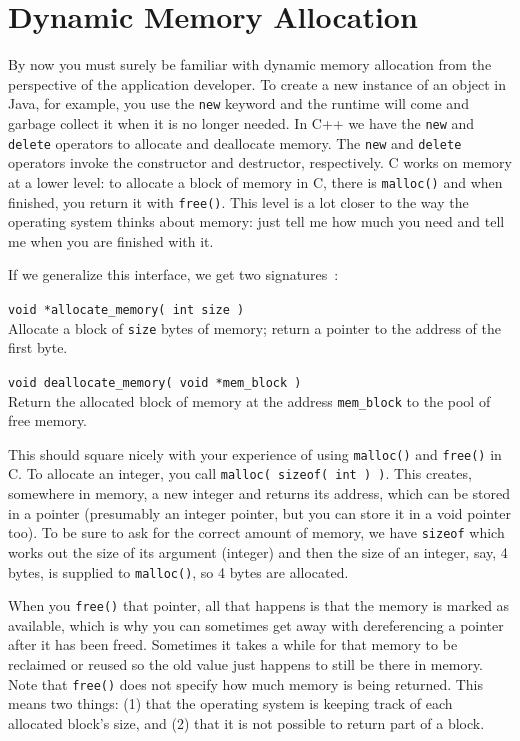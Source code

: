




\section*{Dynamic Memory Allocation}
By now you must surely be familiar with dynamic memory allocation from the perspective of the application developer. To create a new instance of an object in Java, for example, you use the \texttt{new} keyword and the runtime will come and garbage collect it when it is no longer needed. In C++ we have the \texttt{new} and \texttt{delete} operators to allocate and deallocate memory. The \texttt{new} and \texttt{delete} operators invoke the constructor and destructor, respectively. C works on memory at a lower level: to allocate a block of memory in C, there is \texttt{malloc()} and when finished, you return it with \texttt{free()}. This level is a lot closer to the way the operating system thinks about memory: just tell me how much you need and tell me when you are finished with it.

If we generalize this interface, we get two signatures~\cite{mte241}:

\texttt{void *allocate\_memory( int size )}\\
Allocate a block of \texttt{size} bytes of memory; return a pointer to the address of the first byte.

\texttt{void deallocate\_memory( void *mem\_block )}\\
Return the allocated block of memory at the address \texttt{mem\_block} to the pool of free memory.

This should square nicely with your experience of using \texttt{malloc()} and \texttt{free()} in C. To allocate an integer, you call \texttt{malloc( sizeof( int ) )}. This creates, somewhere in memory, a new integer and returns its address, which can be stored in a pointer (presumably an integer pointer, but you can store it in a void pointer too). To be sure to ask for the correct amount of memory, we have \texttt{sizeof} which works out the size of its argument (integer) and then the size of an integer, say, 4 bytes, is supplied to \texttt{malloc()}, so 4 bytes are allocated. 

When you \texttt{free()} that pointer, all that happens is that the memory is marked as available, which is why you can sometimes get away with dereferencing a pointer after it has been freed. Sometimes it takes a while for that memory to be reclaimed or reused so the old value just happens to still be there in memory. Note that \texttt{free()} does not specify how much memory is being returned. This means two things: (1) that the operating system is keeping track of each allocated block's size, and (2) that it is not possible to return part of a block.

